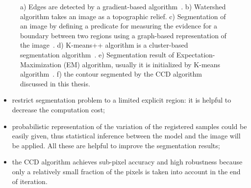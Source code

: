 \begin{figure}[htbp]
\begin{minipage}[t]{0.5\linewidth}
  \end{minipage} 
  \begin{minipage}[t]{0.5\linewidth} 
    \centering 
  \end{minipage}
  \begin{minipage}[t]{0.5\linewidth} 
    \centering 
  \end{minipage}%
\caption[Resulting images after applying some segmentation methods]{a)
  Edges are detected by a gradient-based algorithm~\cite{scharr2000optimal}. b) Watershed algorithm takes an image as a
  topographic relief. c) Segmentation of an image by defining a predicate for
  measuring the evidence for a boundary between two regions using a
  graph-based representation of the
  image~\cite{felzenszwalb2004efficient}. d) K-means++ algorithm is a
  cluster-based segmentation algorithm~\cite{arthur2007k}. e)
  Segmentation result of Expectation-Maximization (EM) algorithm,
  usually it is initialized by K-means algorithm~\cite{bishop2006pattern}. f) the contour segmented by the CCD
  algorithm discussed in this thesis.}
\label{fig:seg_comparison}
\end{figure}

\begin{itemize}
\item restrict segmentation problem to a limited explicit region: it is helpful
  to decrease the computation cost;
\item probabilistic representation of the variation of the registered
  samples could be easily given, thus statistical inference between
  the model and the image will be applied. All these are helpful to
  improve the segmentation results;
\item the CCD algorithm achieves sub-pixel accuracy and high
  robustness because only a relatively small fraction of the pixels is
  taken into account in the end of iteration.
\end{itemize}

